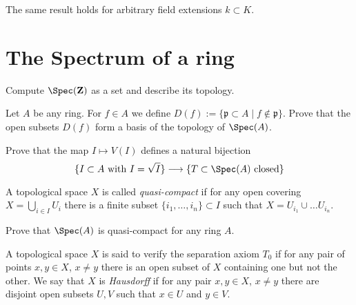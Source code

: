 \begin{remark}
\label{remark-flat-given-residue-field-extension-general}
The same result holds for arbitrary field extensions $k \subset K$.
\end{remark}










\section{The Spectrum of a ring}
\label{section-spectrum-ring}

\begin{exercise}
\label{exercise-spec-Z}
Compute $\Spec(\mathbf{Z})$ as a set and describe its topology.
\end{exercise}

\begin{exercise}
\label{exercise-basis-opens-standard}
Let $A$ be any ring. For $f\in A$ we define
$D(f):= \{\mathfrak p \subset A \mid f \not \in \mathfrak p\}$.
Prove that the open subsets $D(f)$ form a basis of the topology of
$\Spec(A)$.
\end{exercise}

\begin{exercise}
\label{exercise-radical-ideals-closed}
Prove that the map $I\mapsto V(I)$
defines a natural bijection
$$
\{I\subset A\text{ with }I = \sqrt{I}\}
\longrightarrow
\{T\subset \Spec(A)\text{ closed}\}
$$
\end{exercise}

\begin{definition}
\label{definition-quasi-compact}
A topological space $X$ is called {\it quasi-compact}
if for any open covering $X = \bigcup_{i\in I} U_i$ there is a finite
subset $\{i_1, \ldots, i_n\}\subset I$ such that $X = U_{i_1}\cup\ldots
U_{i_n}$.
\end{definition}

\begin{exercise}
\label{exercise-spec-quasi-compact}
Prove that $\Spec(A)$ is quasi-compact for any ring $A$.
\end{exercise}

\begin{definition}
\label{definition-Hausdorff}
A topological space $X$ is said to verify the separation axiom $T_0$
if for any pair of points $x, y\in X$, $x\not = y$ there is an open
subset of $X$ containing one but not the other.
We say that $X$ is {\it Hausdorff} if for any pair $x, y\in X$, $x\not = y$
there are disjoint open subsets $U, V$ such that $x\in U$
and $y\in V$.
\end{definition}

